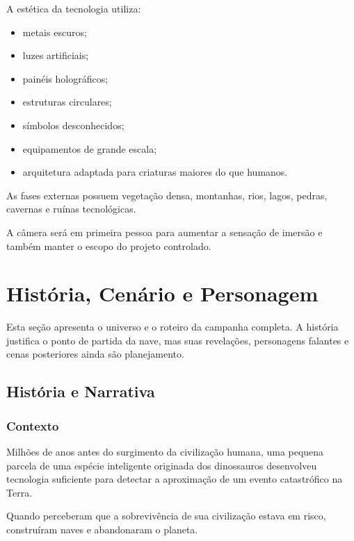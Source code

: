 \documentclass[12pt,a4paper]{article}
\begin{document}
A estética da tecnologia utiliza:

\begin{itemize}
    \item metais escuros;
    \item luzes artificiais;
    \item painéis holográficos;
    \item estruturas circulares;
    \item símbolos desconhecidos;
    \item equipamentos de grande escala;
    \item arquitetura adaptada para criaturas maiores do que humanos.
\end{itemize}

As fases externas possuem vegetação densa, montanhas, rios, lagos,
pedras, cavernas e ruínas tecnológicas.

A câmera será em primeira pessoa para aumentar a sensação de
imersão e também manter o escopo do projeto controlado.


\section{História, Cenário e Personagem}

Esta seção apresenta o universo e o roteiro da campanha completa.
A história justifica o ponto de partida da nave, mas suas revelações,
personagens falantes e cenas posteriores ainda são planejamento.


\subsection{História e Narrativa}

\subsubsection*{Contexto}

Milhões de anos antes do surgimento da civilização humana, uma
pequena parcela de uma espécie inteligente originada dos dinossauros
desenvolveu tecnologia suficiente para detectar a aproximação de um
evento catastrófico na Terra.

Quando perceberam que a sobrevivência de sua civilização estava em
risco, construíram naves e abandonaram o planeta.
\end{document}
